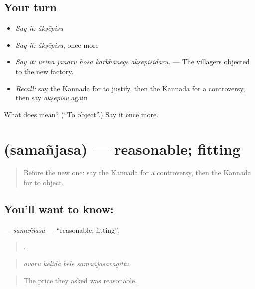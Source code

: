 \subsection*{Your turn}
\begin{itemize}
\raggedright
  \item \emph{Say it:} \emph{ākṣēpisu}
  \item \emph{Say it:} \emph{ākṣēpisu}, once more
  \item \emph{Say it:} \emph{ūrina janaru hosa kārkhānege ākṣēpisidaru.} — The villagers objected to the new factory.
  \item \emph{Recall:} say the Kannada for to justify, then the Kannada for a controversy, then say \emph{ākṣēpisu} again
\end{itemize}

\begin{tcolorbox}[breakable,colback=teal!4,colframe=teal!35!black,title={Before you move on}]
What does  mean? (\textquotedblleft{}To object\textquotedblright{}.) Say it once more.
\end{tcolorbox}
\section[\texorpdfstring{\kn{ಸಮಂಜಸ} (samañjasa)}{ಸಮಂಜಸ (samañjasa)}]{ (samañjasa) — reasonable; fitting}

\label{lesson:KA-C377-samanjasa}



\begin{quote}
Before the new one: say the Kannada for a controversy, then the Kannada for to object.
\end{quote}

\subsection*{You'll want to know: }
\textbf{} — \emph{samañjasa} — \textquotedblleft{}reasonable; fitting\textquotedblright{}.

\begin{quote}
   .
\end{quote}

\begin{quote}
\emph{avaru kēḷida bele samañjasavāgittu.}
\end{quote}

\begin{quote}
The price they asked was reasonable.
\end{quote}

